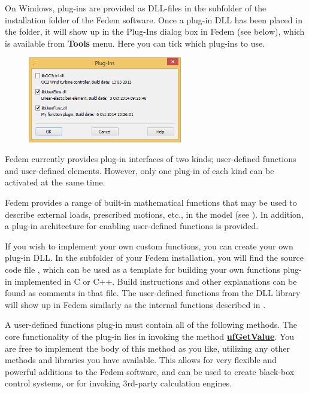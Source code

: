 \clearpage



On Windows, plug-ins are provided as DLL-files in the  subfolder
of the installation folder of the Fedem software. Once a plug-in DLL has been
placed in the  folder, it will show up in the Plug-Ins dialog box
in Fedem (see below), which is available from \textbf{Tools} menu.
Here you can tick which plug-ins to use.

\begin{figure}[!h]
  \center\includegraphics[width=0.6\textwidth]{Figures/Dialogs/2-Plugins}
\end{figure}

Fedem currently provides plug-in interfaces of two kinds; user-defined functions
and user-defined elements. However, only one plug-in of each kind can be
activated at the same time.



Fedem provides a range of built-in mathematical functions that may be
used to describe external loads, prescribed motions, etc., in the model
(see ).
In addition, a plug-in architecture for enabling user-defined functions
is provided.

If you wish to implement your own custom functions, you can create your
own plug-in DLL. In the  subfolder of your Fedem installation,
you will find the source code file , which can be used as
a template for building your own functions plug-in implemented in C or C++.
Build instructions and other explanations can be found as comments in that file.
The user-defined functions from the DLL library will show up in Fedem similarly
as the internal functions described in .

A user-defined functions plug-in must contain all of the following methods.
The core functionality of the plug-in lies in invoking the method
\protect\hyperlink{ufgetvalue}{\bf ufGetValue}.
You are free to implement the body of this method as you like,
utilizing any other methods and libraries you have available.
This allows for very flexible and powerful additions to the Fedem software,
and can be used to create black-box control systems, or for invoking 3rd-party
calculation engines.

